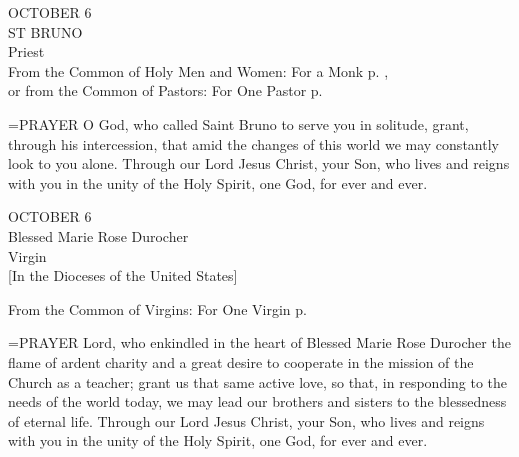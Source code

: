 \begin{center}\normalsize OCTOBER 6\\
\footnotesize ST BRUNO\\
\footnotesize Priest\\
\footnotesize From the Common of Holy Men and Women: For a Monk p.   ,\\
\footnotesize or from the Common of Pastors: For One Pastor p.\\
\end{center}

\hangindent=\parindent \small{PRAYER 
O God, who called Saint Bruno to serve you in solitude,
grant, through his intercession,
that amid the changes of this world
we may constantly look to you alone.
Through our Lord Jesus Christ, your Son,
who lives and reigns with you in the unity of the Holy Spirit,
one God, for ever and ever.\\}
 
\begin{center}\normalsize OCTOBER 6\\
\footnotesize Blessed Marie Rose Durocher\\
\footnotesize Virgin\\
\footnotesize [In the Dioceses of the United States]\\
\end{center}

From the Common of Virgins: For One Virgin p.

\hangindent=\parindent \small{PRAYER 
Lord, who enkindled in the heart of Blessed Marie Rose Durocher
the flame of ardent charity
and a great desire to cooperate
in the mission of the Church as a teacher;
grant us that same active love,
so that, in responding to the needs of the world today, we may lead our brothers and sisters
to the blessedness of eternal life.
Through our Lord Jesus Christ, your Son,
who lives and reigns with you in the unity of the Holy Spirit,
one God, for ever and ever.\\}
 
